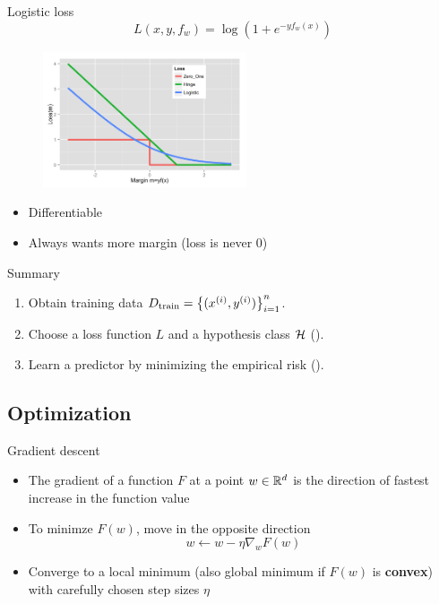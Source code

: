 \documentclass[usenames,dvipsnames,notes,11pt,aspectratio=169]{beamer}
\begin{document}
\begin{frame}
    {Logistic loss}
    $$
    L(x,y,f_w) = \log(1+e^{-yf_w(x)})
    $$
    \begin{figure}
        \includegraphics[height=4cm]{figures/loss.Zero_One.Hinge.Logistic.png}
    \end{figure}
    \begin{itemize}
        \item Differentiable
        \item Always wants more margin (loss is never 0)
    \end{itemize}
\end{frame}

\begin{frame}
    {Summary}
    \begin{enumerate}
        \itemsep2em
        \item Obtain training data $D_{\text{train}}=\left\{ (x^{(i)}, y^{(i)}) \right\}_{i=1}^n$.
        \item Choose a loss function $L$ and a hypothesis class $\mathcal{H}$ ().
        \item Learn a predictor by minimizing the empirical risk ().
    \end{enumerate}
\end{frame}


\subsection{Optimization}

\begin{frame}
    {Gradient descent}
    \begin{itemize}
        \item The gradient of a function $F$ at a point $w \in \mathbb{R}^d$ is the direction of fastest increase in the function value
        \item To minimze $F(w)$, move in the opposite direction
        $$w \leftarrow w - \eta\nabla_w F(w)$$
        \item Converge to a local minimum (also global minimum if $F(w)$ is \textbf{convex}) with carefully chosen step sizes $\eta$
    \end{itemize}
\end{frame}
\end{document}
